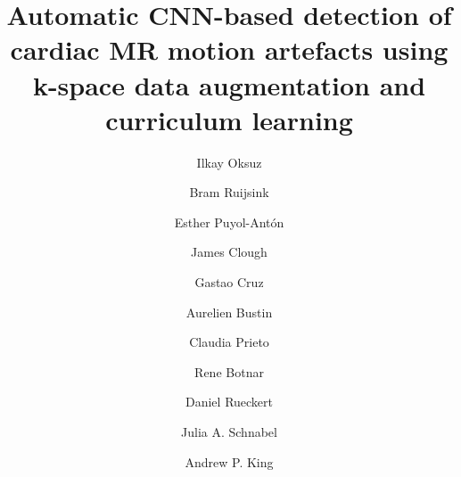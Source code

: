 \documentclass[preprint,12pt,authoryear]{elsarticle}
\begin{document}



\begin{frontmatter}
\title{Automatic CNN-based detection of cardiac MR motion artefacts using k-space data augmentation and curriculum learning}

\author[KCL]{Ilkay Oksuz} 

\author[KCL,NHS]{Bram Ruijsink}
\author[KCL]{Esther Puyol-Ant\'on} 
\author[KCL]{James Clough} 
\author[KCL]{Gastao Cruz}
\author[KCL]{Aurelien Bustin}
\author[KCL]{Claudia Prieto}
\author[KCL]{Rene Botnar}
\author[Imperial]{Daniel Rueckert}
\author[KCL]{Julia A. Schnabel}
\author[KCL]{Andrew P. King}

\address[KCL]{School of Biomedical Engineering \& Imaging Sciences, King\textquotesingle s College London, U.K}
\address[NHS]{Guy\textquotesingle s and St Thomas\textquotesingle{} Hospital NHS Foundation Trust, London, UK.}
\address[Imperial]{Biomedical Image Analysis Group, Imperial College London, UK.}



\begin{abstract}


\end{abstract}
\end{frontmatter}
\end{document}
